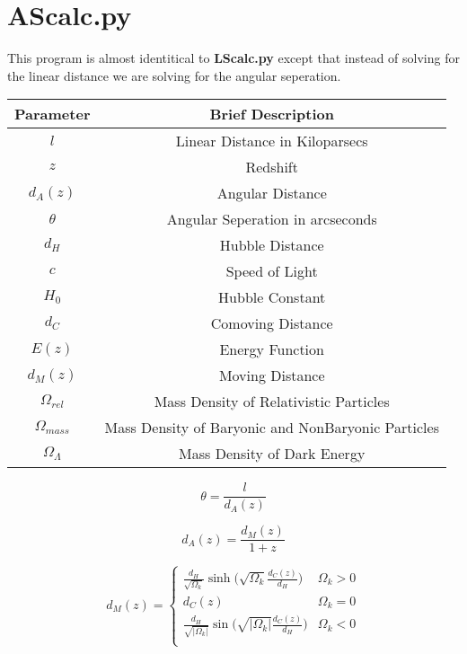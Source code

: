 \documentclass[11pt,letterpaper]{article}
\begin{document}
\section{AScalc.py}
This program is almost identitical to \textbf{LScalc.py} except that instead of solving for the linear distance we are solving for the angular seperation.
\begin{center}
	\begin{tabular}{|c|c|}
		\hline 
		Parameter & Brief Description \\ 
		\hline 
		$l$ & Linear Distance in Kiloparsecs \\ 
		\hline 
		$z$ & Redshift \\
		\hline
		$d_A(z)$ & Angular Distance \\
		\hline 
		$\theta$ & Angular Seperation in arcseconds \\
		\hline
		$d_H$ & Hubble Distance \\
		\hline
		$c$ & Speed of Light \\
		\hline
		$H_0$ & Hubble Constant \\
		\hline
		$d_C$ & Comoving Distance \\
		\hline 
		$E(z)$ & Energy Function \\
		\hline 
		$d_M(z)$ & Moving Distance \\
		\hline 
		$\Omega_{rel}$ & Mass Density of Relativistic Particles \\
		\hline
		$\Omega_{mass}$ & Mass Density of Baryonic and NonBaryonic Particles \\
		\hline
		$\Omega_{\Lambda}$ & Mass Density of Dark Energy \\
		\hline
	\end{tabular} 
\end{center}
\begin{equation}
	\theta = \frac{l}{d_A(z)}
\end{equation}

\begin{equation}
	d_A(z) = \frac{d_M(z)}{1+z}
\end{equation}

\begin{equation}
d_M(z) = \left\{ \begin{array}{ll}
\frac{d_H}{\sqrt{\Omega_k}}\sinh\Big({\sqrt{\Omega_k}\frac{d_C(z)}{d_H}}\Big) & \Omega_k > 0 \\
d_C(z) & \Omega_k = 0 \\
\frac{d_H}{\sqrt{|\Omega_k|}}\sin\Big({\sqrt{|\Omega_k|}\frac{d_C(z)}{d_H}}\Big) & \Omega_k < 0 \\
\end{array} \right.	 
\end{equation}	
\end{document}
